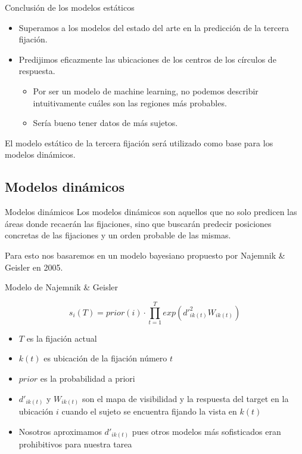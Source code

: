 \documentclass[compress]{beamer}
\begin{document}
\begin{frame}{Conclusión de los modelos estáticos}
\begin{itemize}
\item Superamos a los modelos del estado del arte en la predicción de la tercera fijación.
\item Predijimos eficazmente las ubicaciones de los centros de los círculos de respuesta.
\begin{itemize}
\item Por ser un modelo de machine learning, no podemos describir intuitivamente cuáles son las regiones más probables.
\item Sería bueno tener datos de más sujetos.
\end{itemize}
\end{itemize}

\bigskip

El modelo estático de la tercera fijación será utilizado como base para los modelos dinámicos.
\end{frame}

\subsection{Modelos dinámicos}
\begin{frame}{Modelos dinámicos}
Los modelos dinámicos son aquellos que no solo predicen las áreas donde
recaerán las fijaciones, sino que buscarán predecir posiciones concretas de las fijaciones y un orden probable de las mismas.

\bigskip

Para esto nos basaremos en un modelo bayesiano propuesto por Najemnik \& Geisler en 2005. 
\end{frame}

\begin{frame}{Modelo de Najemnik \& Geisler}

$$s_{i}(T) = prior(i) \cdot \prod_{t=1}^T exp\left(d'^2_{ik(t)} W_{ik(t)}\right)$$

\begin{itemize}
\item $T$ es la fijación actual
\item $k(t)$ es ubicación de la fijación número $t$
\item $prior$ es la probabilidad a priori
\item $d'_{ik(t)}$ y $W_{ik(t)}$ son el mapa de visibilidad y la respuesta del target en la ubicación $i$ cuando el sujeto se encuentra fijando la vista en $k(t)$
\item Nosotros aproximamos $d'_{ik(t)}$ pues otros modelos más sofisticados eran prohibitivos para nuestra tarea
\end{itemize}
\end{frame}
\end{document}
